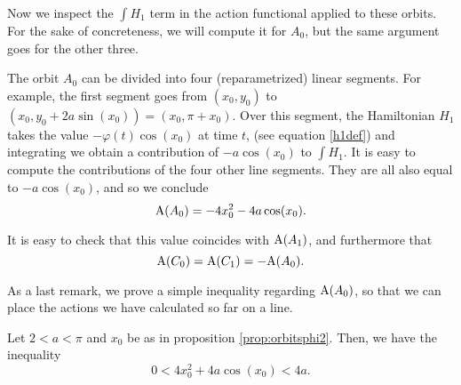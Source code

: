 Now we inspect the $\int H_1$ term in the action functional applied to these orbits. For the sake of concreteness, we will compute it for $A_0$, but the same argument goes for the other three.

The orbit $A_0$ can be divided into four (reparametrized) linear segments. For example, the first segment goes from $(x_0, y_0)$ to $(x_0, y_0 + 2a \sin(x_0)) = (x_0, \pi + x_0)$. Over this segment, the Hamiltonian $H_1$ takes the value $- \varphi(t) \cos(x_0)$ at time $t$, (see equation \eqref{h1def}) and integrating we obtain a contribution of $- a \cos(x_0)$ to $\int H_1$. It is easy to compute the contributions of the four other line segments. They are all also equal to $- a \cos(x_0)$, and so we conclude
\begin{equation}
\AA(A_0) = - 4 x_0^2 - 4 a \cos(x_0).
\end{equation}

It is easy to check that this value coincides with $\AA(A_1)$, and furthermore that
\begin{equation}
\AA(C_0) = \AA(C_1) = - \AA(A_0).
\end{equation}

As a last remark, we prove a simple inequality regarding $\AA(A_0)$, so that we can place the actions we have calculated so far on a line.

\begin{prop}
Let $2 < a < \pi$ and $x_0$ be as in proposition \ref{prop:orbitsphi2}. Then, we have the inequality
\begin{equation}
0 < 4 x_0^2 + 4 a \cos(x_0) < 4a.
\end{equation}
\end{prop}

